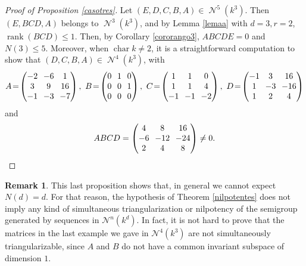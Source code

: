 \documentclass[11pt]{article}
\let\mathcal\mathscr
\theoremstyle{plain}
\theoremstyle{definition}
\newtheorem{obs}[teo]{Remark}
\DeclareMathOperator{\Char}{char}
\DeclareMathOperator{\Nil}{\mathcal{N}}
\DeclareMathOperator{\rank}{rank}
\begin{document}
\begin{proof}[Proof of Proposition \ref{casotres}]
Let $(E,D,C,B,A)\in \Nil^{5}(k^{3})$. Then $(E,BCD,A)$ belongs to $\Nil^{3}(k^{3})$, and by Lemma \ref{lemaa} with $d=3, r=2$, $\rank(BCD)\leq 1$. Then, by Corollary \ref{cororango3}, $ABCDE=0$ and $N(3)\leq 5$.
Moreover, when $\Char{k}\neq 2$, it is a straightforward computation to show that $(D,C,B,A)\in \Nil^{4}(k^{3})$, with
\begin{equation*}
\arraycolsep3.5pt
A\!=\!\begin{pmatrix}
-2 & -6 & 1\\
3 & 9 & 16\\
-1 & -3 & -7\\
\end{pmatrix},\ B\!=\!\begin{pmatrix}
0 & 1 & 0\\
0 & 0 & 1\\
0 & 0 & 0\\
\end{pmatrix},\ C\!=\!\begin{pmatrix}
1 & 1 & 0\\
1 & 1 & 4\\
-1 & -1 & -2\\
\end{pmatrix},\ D\!=\!\begin{pmatrix}
-1 & 3 & 16\\
1 & -3 & -16\\
1 & 2 & 4\\
\end{pmatrix}
\end{equation*}
and
\[\arraycolsep3.5pt
ABCD=\begin{pmatrix}
4 & 8 & 16\\
-6 & -12 & -24\\
2 & 4 & 8\\
\end{pmatrix}\neq 0.\qedhere
\]
\end{proof}

\begin{obs} This last proposition shows that, in general we cannot expect \hbox{$N(d)=d$}. For that reason, the hypothesis of Theorem \ref{nilpotentes} does not imply any kind of simultaneous triangularization or nilpotency of the semigroup generated by sequences in $\mathcal{N}^{n}(k^{d})$. In fact, it is not hard to prove that the matrices in the last example we gave in $\mathcal{N}^{4}(k^{3})$ are not simultaneously triangularizable, since $A$ and $B$ do not have a common invariant subspace of dimension $1$.
\end{obs}
\end{document}
